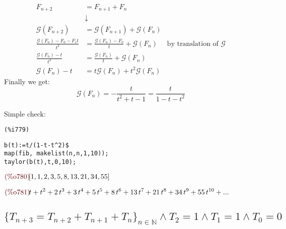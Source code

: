 \begin{displaymath}
  \begin{split}
    F_{n+2} &= F_{n+1} + F_{n}  \\
    &\downarrow \\
    \mathcal{G} (F_{n+2}) &= \mathcal{G} (F_{n+1}) + \mathcal{G}
    (F_{n}) \\
    \frac{\mathcal{G} (F_n) - F_0 - F_1 t}{t^2} &= \frac{\mathcal{G}
      (F_n) - F_0}{t} + \mathcal{G}
    (F_{n}) \quad \text{ by translation of } \mathcal{G} \\
    \frac{\mathcal{G} (F_n) - t}{t^2} &= \frac{\mathcal{G} (F_n) }{t}
    + \mathcal{G}
    (F_{n}) \\
    \mathcal{G} (F_n) - t &= t \mathcal{G} (F_n) + t^2 \mathcal{G}
    (F_n)    
  \end{split}
\end{displaymath}
Finally we get:
\begin{equation}
  \label{eq:fibonacci-generating-function}
  \mathcal{G} (F_n) = - \frac{t}{t^2 + t - 1} = \frac{t}{1-t-t^2}
\end{equation}

Simple check:

\noindent
\begin{minipage}[t]{8ex}{\color{red}\bf
\begin{verbatim}
(%i779) 
\end{verbatim}}
\end{minipage}
\begin{minipage}[t]{\textwidth}{\color{blue}
\begin{verbatim}
b(t):=t/(1-t-t^2)$
map(fib, makelist(n,n,1,10));
taylor(b(t),t,0,10);
\end{verbatim}}
\end{minipage}
\begin{math}\displaystyle
\parbox{8ex}{\color{labelcolor}(\%o780) }
[1,1,2,3,5,8,13,21,34,55]
\end{math}

\begin{math}\displaystyle
\parbox{8ex}{\color{labelcolor}(\%o781) }
t+{t}^{2}+2\,{t}^{3}+3\,{t}^{4}+5\,{t}^{5}+8\,{t}^{6}+13\,{t}^{7}+21\,{t}^{8}+34\,{t}^{9}+55\,{t}^{10}+...
\end{math}

\subsection{$\{T_{n+3} = T_{n+2} + T_{n+1} + T_{n} \}_{n\in
    \mathbb{N}} \wedge T_2 = 1 \wedge T_1 = 1 \wedge T_0 = 0 $}


